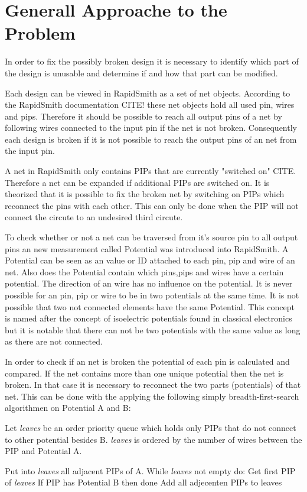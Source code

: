 \chapter{Generall Approache to the Problem}
\label{cha:approachestotheproblem}

In order to fix the possibly broken design it is necessary to identify which part of the design is unusable and determine if and how that part can be modified.

Each design can be viewed in RapidSmith as a set of net objects. According to the RapidSmith documentation CITE! these net objects hold all used pin, wires and pips.
Therefore it should be possible to reach all output pins of a net by following wires connected to the input pin if the net is not broken.
Consequently each design is broken if it is not possible to reach the output pins of an net from the input pin.  

A net in RapidSmith only contains PIPs that are currently "switched on" CITE. Therefore a net can be expanded if additional PIPs are switched on. 
It is theorized that it is possible to fix the broken net by switching on PIPs which reconnect the pins with each other. This can only be done when the PIP will not connect the circute to an undesired third circute.

To check whether or not a net can be traversed from it's source pin to all output pins an new measurement called Potential was introduced into RapidSmith.
A Potential can be seen as an value or ID attached to each pin, pip and wire of an net. Also does the Potential contain which pins,pips and wires have a certain potential. The direction of an wire has no influence on the potential.
It is never possible for an pin, pip or wire to be in two potentials at the same time. It is not possible that two not connected elements have the same Potential. 
This concept is named after the concept of isoelectric potentials found in classical electronics but it is notable that there can not be two potentials with the same value as long as there are not connected.

In order to check if an net is broken the potential of each pin is calculated and compared. If the net contains more than one unique potential then the net is broken.
In that case it is necessary to reconnect the two parts (potentials) of that net. This can be done with the applying the following simply breadth-first-search algorithmen on Potential A and B:

Let \textit{leaves} be an order priority queue which holds only PIPs that do not connect to other potential besides B. \textit{leaves} is ordered by the number of wires between the PIP and Potential A.

Put into \textit{leaves} all adjacent PIPs of A.
While \textit{leaves} not empty do:
	Get first PIP of \textit{leaves}
	If PIP has Potential B then done
	Add all adjecenten PIPs to leaves

